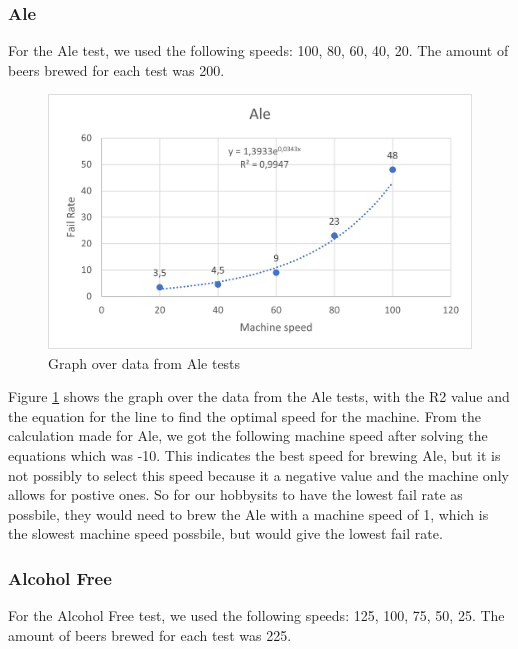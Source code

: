 \subsubsection{Ale}
For the Ale test, we used the following speeds: 100, 80, 60, 40, 20. The amount of beers brewed for each test was 200.

\begin{center}
    \centering
    \begin{figure}[H]
        \includegraphics[width=1\textwidth]{img/Ale_graph.png}
        \caption{Graph over data from Ale tests}
        \label{fig:Ale_graph}
    \end{figure}
\end{center}

Figure \ref{fig:Ale_graph} shows the graph over the data from the Ale tests, with the R2 value and the equation for the line to find the optimal speed for the machine. \newline
From the calculation made for Ale, we got the following machine speed after solving the equations which was -10. This indicates the best speed for brewing Ale, but it is not possibly to select this speed because it a negative value and the machine only allows for postive ones. 
So for our hobbysits to have the lowest fail rate as possbile, they would need to brew the Ale with a machine speed of 1, which is the slowest machine speed possbile, but would give the lowest fail rate. \newline


\subsubsection{Alcohol Free}
For the Alcohol Free test, we used the following speeds: 125, 100, 75, 50, 25. The amount of beers brewed for each test was 225.

